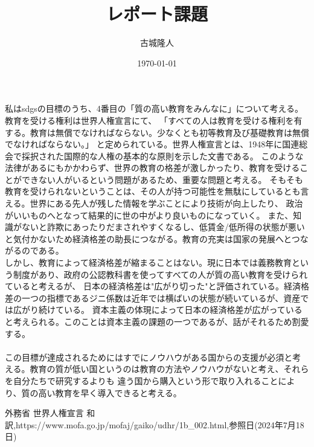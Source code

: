 \documentclass[a4paper,11pt]{jsarticle}
\begin{document}
\title{レポート課題}
\author{古城隆人}
\date{\today}
\maketitle

\newpage
私はsdgsの目標のうち、4番目の「質の高い教育をみんなに」について考える。
教育を受ける権利は世界人権宣言にて、
「すべての人は教育を受ける権利を有する。教育は無償でなければならない。少なくとも初等教育及び基礎教育は無償でなければならない。」\cite{zinken}
と定められている。世界人権宣言とは、1948年に国連総会で採択された国際的な人権の基本的な原則を示した文書である。
このような法律があるにもかかわらず、世界の教育の格差が激しかったり、教育を受けることができない人がいるという問題があるため、重要な問題と考える。
そもそも教育を受けられないということは、その人が持つ可能性を無駄にしているとも言える。世界にある先人が残した情報を学ぶことにより技術が向上したり、
政治がいいものへとなって結果的に世の中がより良いものになっていく。
また、知識がないと詐欺にあったりだまされやすくなるし、低賃金/低所得の状態が悪いと気付かないため経済格差の助長につながる。教育の充実は国家の発展へとつながるのである。\\
しかし、教育によって経済格差が縮まることはない。現に日本では義務教育という制度があり、政府の公認教科書を使ってすべての人が質の高い教育を受けられていると考えるが、
日本の経済格差は"広がり切った"と評価されている。経済格差の一つの指標であるジニ係数は近年では横ばいの状態が続いているが、資産では広がり続けている。
資本主義の体現によって日本の経済格差が広がっていると考えられる。このことは資本主義の課題の一つであるが、話がそれるため割愛する。\\
\\
この目標が達成されるためにはすでにノウハウがある国からの支援が必須と考える。教育の質が低い国というのは教育の方法やノウハウがないと考え、それらを自分たちで研究するよりも
違う国から購入という形で取り入れることにより、質の高い教育を早く導入できると考える。

\begin{thebibliography}{99}
   外務省 世界人権宣言 和訳,https://www.mofa.go.jp/mofaj/gaiko/udhr/1b\_002.html,参照日(2024年7月18日)
\end{thebibliography}  
\end{document}
